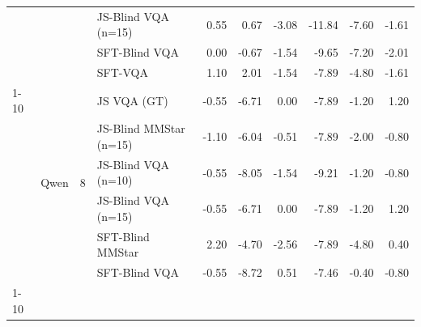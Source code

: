 \begin{tabular}{llllrrrrrr}
 &  &  & JS-Blind VQA (n=15) & 0.55 & 0.67 & -3.08 & -11.84 & -7.60 & -1.61 \\
 &  &  & SFT-Blind VQA & 0.00 & -0.67 & -1.54 & -9.65 & -7.20 & -2.01 \\
 &  &  & SFT-VQA & 1.10 & 2.01 & -1.54 & -7.89 & -4.80 & -1.61 \\
\cline{1-10} \cline{2-10} \cline{3-10}
\multirow[t]{6}{*}{Qwen3‑VL (8B)} & \multirow[t]{6}{*}{Qwen} & \multirow[t]{6}{*}{8} & JS VQA (GT) & -0.55 & -6.71 & 0.00 & -7.89 & -1.20 & 1.20 \\
 &  &  & JS-Blind MMStar (n=15) & -1.10 & -6.04 & -0.51 & -7.89 & -2.00 & -0.80 \\
 &  &  & JS-Blind VQA (n=10) & -0.55 & -8.05 & -1.54 & -9.21 & -1.20 & -0.80 \\
 &  &  & JS-Blind VQA (n=15) & -0.55 & -6.71 & 0.00 & -7.89 & -1.20 & 1.20 \\
 &  &  & SFT-Blind MMStar & 2.20 & -4.70 & -2.56 & -7.89 & -4.80 & 0.40 \\
 &  &  & SFT-Blind VQA & -0.55 & -8.72 & 0.51 & -7.46 & -0.40 & -0.80 \\
\cline{1-10} \cline{2-10} \cline{3-10}
\bottomrule
\end{tabular}
